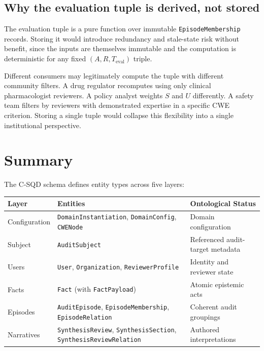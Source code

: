 \documentclass[11pt]{article}
\begin{document}
\subsection{Why the evaluation tuple is derived, not stored}
\label{sec:tuple-rationale}

The evaluation tuple is a pure function over immutable
\texttt{EpisodeMembership} records. Storing it would introduce redundancy and
stale-state risk without benefit, since the inputs are themselves immutable and
the computation is deterministic for any fixed $(A, R, T_\text{eval})$ triple.

Different consumers may legitimately compute the tuple with different community
filters. A drug regulator recomputes using only clinical pharmacologist
reviewers. A policy analyst weights $S$ and $U$ differently. A safety team
filters by reviewers with demonstrated expertise in a specific CWE criterion.
Storing a single tuple would collapse this flexibility into a single
institutional perspective.

\section{Summary}

The C-SQD schema defines entity types across five layers:

\begin{center}
\renewcommand{\arraystretch}{1.4}
\begin{tabular}{l l l}
\textbf{Layer} & \textbf{Entities} & \textbf{Ontological Status} \\
\hline
Configuration &
  \texttt{DomainInstantiation}, \texttt{DomainConfig}, \texttt{CWENode} &
  Domain configuration \\
Subject &
  \texttt{AuditSubject} &
  Referenced audit-target metadata \\
Users &
  \texttt{User}, \texttt{Organization}, \texttt{ReviewerProfile} &
  Identity and reviewer state \\
Facts &
  \texttt{Fact} (with \texttt{FactPayload}) &
  Atomic epistemic acts \\
Episodes &
  \texttt{AuditEpisode}, \texttt{EpisodeMembership}, \texttt{EpisodeRelation} &
  Coherent audit groupings \\
Narratives &
  \texttt{SynthesisReview}, \texttt{SynthesisSection}, \texttt{SynthesisReviewRelation} &
  Authored interpretations \\
\end{tabular}
\end{center}
\end{document}
